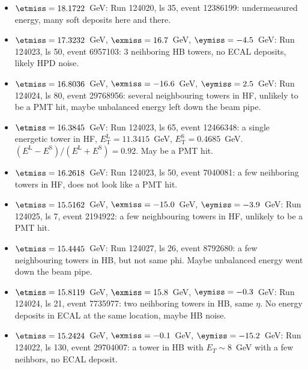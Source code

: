 \begin{itemize}
\item $\etmiss=18.1722$~GeV: Run 124020, ls 35, event 12386199:
  undermeasured energy, many soft deposits here and there.

\item $\etmiss=17.3232$~GeV, $\exmiss=16.7$~GeV, $\eymiss=-4.5$~GeV: Run
  124023, ls 50, event 6957103: 3 neihboring HB towers, no ECAL
  deposits, likely HPD noise.

\item $\etmiss=16.8036$~GeV, $\exmiss=-16.6$~GeV, $\eymiss=2.5$~GeV: Run
  124024, ls 80, event 29768956: several neighbouring towers in HF,
  unlikely to be a PMT hit, maybe unbalanced energy left down the beam
  pipe.

\item $\etmiss=16.3845$~GeV: Run 124023, ls 65, event 12466348: a single
  energetic tower in HF, $E_\text{T}^\text{L}= 11.3415$~GeV,
  $E_\text{T}^\text{S}=0.4685$~GeV. $(E^\text{L}-E^\text{S})/(E^\text{L}+E^\text{S})=0.92$. May be a PMT hit.

\item $\etmiss=16.2618$~GeV: Run 124023, ls 50, event 7040081: a few
  neihboring towers in HF, does not look like a PMT hit.

\item $\etmiss=15.5162$~GeV, $\exmiss=-15.0$~GeV, $\eymiss=-3.9$~GeV:
  Run 124025, ls 7, event 2194922: a few neighbouring towers in HF,
  unlikely to be a PMT hit.

\item $\etmiss=15.4445$~GeV: Run 124027, ls 26, event 8792680: a few
  neighbouring towers in HB, but not same phi. Maybe unbalanced energy
  went down the beam pipe.

\item $\etmiss=15.8119$~GeV, $\exmiss=15.8$~GeV, $\eymiss=-0.3$~GeV: Run
  124024, ls 21, event 7735977: two neihboring towers in HB, same
  $\eta$.  No energy deposits in ECAL at the same location, maybe HB
  noise.

\item $\etmiss=15.2424$~GeV, $\exmiss=-0.1$~GeV, $\eymiss=-15.2$~GeV:
  Run 124022, ls 130, event 29704007: a tower in HB with $E_T\sim 8$~GeV
  with a few neihbors, no ECAL deposit.
\end{itemize}


